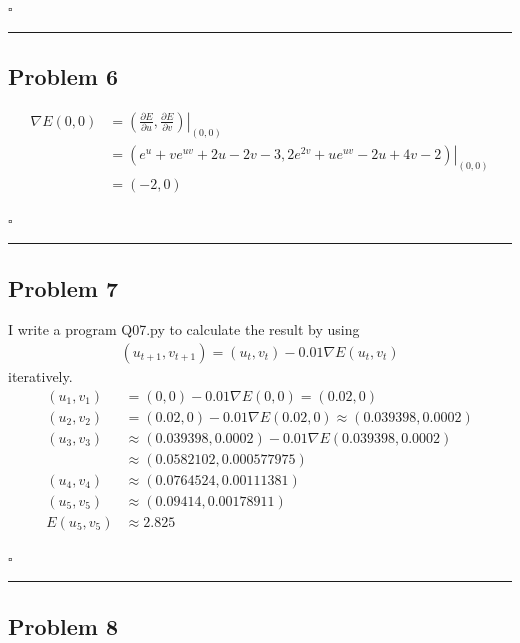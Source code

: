 \documentclass[12pt]{article}
\newcommand*{\QEDB}{\hfill\ensuremath{\square}}
\newcommand{\ParTh}[1]{\left(#1\right)}
\newcommand{\horrule}[1]{\rule{\linewidth}{#1}}
\begin{document}
\QEDB

\horrule{0.5pt}

\subsection*{Problem 6}

\begin{align}
\nabla E(0,0) &= \left.\ParTh{\frac{\partial E}{\partial u},\frac{\partial E}{\partial v}}\right|_{\ParTh{0,0}}\\
&= \left.\ParTh{e^{u}+ve^{uv}+2u-2v-3,2e^{2v}+ue^{uv}-2u+4v-2}\right|_{\ParTh{0,0}}\\
&=\ParTh{-2,0}
\end{align}

\QEDB

\horrule{0.5pt}

\subsection*{Problem 7}

I write a program Q07.py to calculate the result by using
\begin{align}
\ParTh{u_{t+1},v_{t+1}}=\ParTh{u_t,v_t}-0.01\nabla E\ParTh{u_t,v_t}
\end{align}
iteratively.
\begin{align}
\ParTh{u_1,v_1}&=\ParTh{0,0}-0.01\nabla E\ParTh{0,0}=\ParTh{0.02,0}\\
\ParTh{u_2,v_2}&=\ParTh{0.02,0}-0.01\nabla E\ParTh{0.02,0}\approx\ParTh{0.039398,0.0002}\\
\ParTh{u_3,v_3}&\approx\ParTh{0.039398,0.0002}-0.01\nabla E\ParTh{0.039398,0.0002}\\&\approx\ParTh{0.0582102,0.000577975}\\
\ParTh{u_4,v_4}&\approx\ParTh{0.0764524,0.00111381}\\
\ParTh{u_5,v_5}&\approx\ParTh{0.09414,0.00178911}\\
E\ParTh{u_5,v_5}&\approx2.825
\end{align}

\QEDB

\horrule{0.5pt}

\subsection*{Problem 8}
\end{document}
